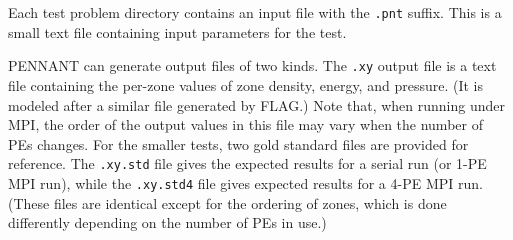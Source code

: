 \documentclass[11pt,letterpaper]{article}
\begin{document}
Each test problem directory contains an input file with the {\tt.pnt}
suffix.  This is a small text file containing input parameters for the
test.

PENNANT can generate output files of two kinds.  The {\tt.xy} output file
is a text file containing the per-zone values of zone density, energy,
and pressure.  (It is modeled after a similar file generated by FLAG.)
Note that, when running under MPI, the order of the output values in
this file may vary when the number of PEs changes.
For the smaller tests, two gold standard files are provided for reference.
The {\tt.xy.std} file gives the expected results for a serial run (or
1-PE MPI run), while the {\tt.xy.std4} file gives expected results for
a 4-PE MPI run.  (These files are identical except for the ordering of
zones, which is done differently depending on the number of PEs in use.)
\end{document}
